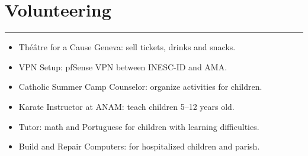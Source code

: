 \documentclass[11pt,a4paper]{article}
\begin{document}
\section*{Volunteering}

\hrule

\begin{itemize}[noitemsep]
    \item Théâtre for a Cause Geneva: sell tickets, drinks and snacks.
    \item VPN Setup: pfSense VPN between INESC-ID and AMA\@.
    \item Catholic Summer Camp Counselor: organize activities for children.
    \item Karate Instructor at ANAM\@: teach children 5--12 years old.
    \item Tutor: math and Portuguese for children with learning difficulties.
    \item Build and Repair Computers: for hospitalized children and parish.
\end{itemize}
\end{document}
